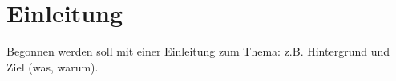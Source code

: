 \chapter{Einleitung}
Begonnen werden soll mit einer Einleitung zum Thema: z.B. Hintergrund und Ziel
(was, warum).
